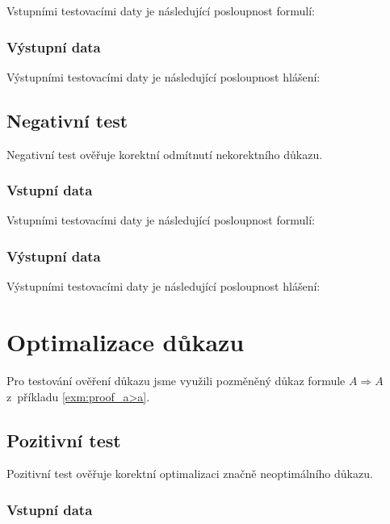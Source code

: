 \documentclass[thesis=B,czech,hidelinks]{thesis}[2012/06/26]
\begin{document}
Vstupními testovacími daty je následující posloupnost formulí:


\subsubsection{Výstupní data}

Výstupními testovacími daty je následující posloupnost hlášení:


\subsection{Negativní test}

Negativní test ověřuje korektní odmítnutí nekorektního důkazu.

\subsubsection{Vstupní data}

Vstupními testovacími daty je následující posloupnost formulí:


\subsubsection{Výstupní data}

Výstupními testovacími daty je následující posloupnost hlášení:


\section{Optimalizace důkazu}

Pro testování ověření důkazu jsme využili pozměněný důkaz formule $A \Rightarrow A$ z~příkladu \ref{exm:proof_a>a}.

\subsection{Pozitivní test}

Pozitivní test ověřuje korektní optimalizaci značně neoptimálního důkazu.

\subsubsection{Vstupní data}
\end{document}
